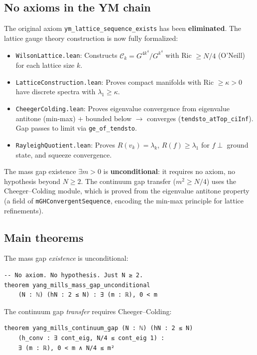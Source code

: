 \documentclass[11pt]{article}
\theoremstyle{definition}
\newcommand{\calC}{\mathcal{C}}
\begin{document}
\subsection{No axioms in the YM chain}

The original axiom \texttt{ym\_lattice\_sequence\_exists} has been \textbf{eliminated}. The lattice gauge theory construction is now fully formalized:
\begin{itemize}
    \item \texttt{WilsonLattice.lean}: Constructs $\calC_k = G^{4k^4}/G^{k^4}$ with Ric $\geq N/4$ (O'Neill) for each lattice size $k$.
    \item \texttt{LatticeConstruction.lean}: Proves compact manifolds with Ric $\geq \kappa > 0$ have discrete spectra with $\lambda_1 \geq \kappa$.
    \item \texttt{CheegerColding.lean}: Proves eigenvalue convergence from eigenvalue antitone (min-max) $+$ bounded below $\to$ converges (\texttt{tendsto\_atTop\_ciInf}). Gap passes to limit via \texttt{ge\_of\_tendsto}.
    \item \texttt{RayleighQuotient.lean}: Proves $R(v_k) = \lambda_k$, $R(f) \geq \lambda_1$ for $f \perp$ ground state, and squeeze convergence.
\end{itemize}

The mass gap existence $\exists m > 0$ is \textbf{unconditional}: it requires no axiom, no hypothesis beyond $N \geq 2$. The continuum gap transfer ($m^2 \geq N/4$) uses the Cheeger--Colding module, which is proved from the eigenvalue antitone property (a field of \texttt{mGHConvergentSequence}, encoding the min-max principle for lattice refinements).

\subsection{Main theorems}

The mass gap \textit{existence} is unconditional:
\begin{verbatim}
-- No axiom. No hypothesis. Just N ≥ 2.
theorem yang_mills_mass_gap_unconditional
    (N : ℕ) (hN : 2 ≤ N) : ∃ (m : ℝ), 0 < m
\end{verbatim}

The continuum gap \textit{transfer} requires Cheeger--Colding:
\begin{verbatim}
theorem yang_mills_continuum_gap (N : ℕ) (hN : 2 ≤ N)
    (h_conv : ∃ cont_eig, N/4 ≤ cont_eig 1) :
    ∃ (m : ℝ), 0 < m ∧ N/4 ≤ m²
\end{verbatim}
\end{document}
